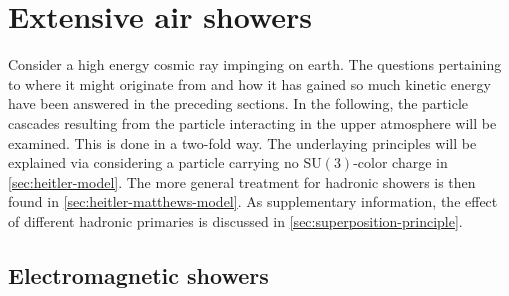 
\chapter{Extensive air showers}
\label{chapter:extensive-air-showers}

Consider a high energy cosmic ray impinging on earth. The questions pertaining to where it might originate from and how it has gained so much kinetic energy have 
been answered in the preceding sections. In the following, the particle cascades resulting from the particle interacting in the upper atmosphere will be examined. 
This is done in a two-fold way. The underlaying principles will be explained via considering a particle carrying no SU$(3)$-color charge in 
\autoref{sec:heitler-model}. The more general treatment for hadronic showers is then found in \autoref{sec:heitler-matthews-model}. As supplementary information, 
the effect of different hadronic primaries is discussed in \autoref{sec:superposition-principle}.

\section{Electromagnetic showers}
\label{sec:heitler-model}

